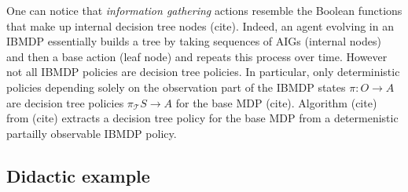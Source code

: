 One can notice that \textit{information gathering} actions resemble the Boolean functions that make up internal decision tree nodes (cite). 
Indeed, an agent evolving in an IBMDP essentially builds a tree by taking sequences of AIGs (internal nodes) and then a base action (leaf node) and repeats this process over time.
However not all IBMDP policies are decision tree policies. In particular, only deterministic policies depending solely on the observation part of the IBMDP states $\pi: O \rightarrow A$ are decision tree policies $\pi_{\mathcal{T}} S \rightarrow A$ for the base MDP (cite).
Algorithm (cite) from (cite) extracts a decision tree policy for the base MDP from a determenistic partailly observable IBMDP policy.

\subsection{Didactic example}
